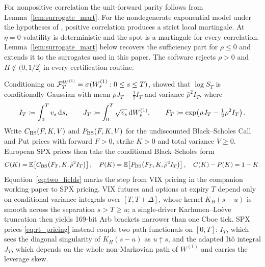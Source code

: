 For nonpositive correlation the unit-forward parity follows from Lemma~\ref{lem:surrogate_mart}. For the nondegenerate exponential model under the hypotheses of \citet[Theorem~1.1]{Gassiat2019}, positive correlation produces a strict local martingale. At $\eta=0$ volatility is deterministic and the spot is a martingale for every correlation. Lemma~\ref{lem:surrogate_mart} below recovers the sufficiency part for $\rho\le 0$ and extends it to the surrogates used in this paper. The software rejects $\rho>0$ and $H\notin(0,1/2]$ in every certification routine.

Conditioning on $\mathcal{F}_T^{W^{(1)}}=\sigma(W_s^{(1)}:0\le s\le T)$, \citet{RomanoTouzi1997} showed that $\log S_T$ is conditionally Gaussian with mean $\rho J_T - \tfrac12 I_T$ and variance $\bar{\rho}^2 I_T$, where
\begin{equation}
  \begin{gathered}
  I_T \coloneqq \int_0^T v_s\,\mathrm{d} s,
  \qquad
  J_T \coloneqq \int_0^T \sqrt{v_s}\,\mathrm{d} W_s^{(1)},
  \qquad
  F_T \coloneqq \exp\!\left(\rho J_T - \tfrac12\rho^2 I_T\right).
  \end{gathered}
  \label{eq:two_fields}
\end{equation}
Write $C_{\mathrm{BS}}(F,K,V)$ and $P_{\mathrm{BS}}(F,K,V)$ for the undiscounted Black--Scholes Call and Put prices with forward $F>0$, strike $K>0$ and total variance $V\ge 0$. European SPX prices then take the conditional Black--Scholes form
\begin{equation}
  \begin{gathered}
  C(K) = \mathbb{E}\!\left[C_{\mathrm{BS}}\!\left(F_T,K,\bar{\rho}^2 I_T\right)\right],
  \quad
  P(K) = \mathbb{E}\!\left[P_{\mathrm{BS}}\!\left(F_T,K,\bar{\rho}^2 I_T\right)\right],
  \quad
  C(K) - P(K) = 1 - K.
  \end{gathered}
  \label{eq:rt_pricing}
\end{equation}
Equation~\eqref{eq:two_fields} marks the step from VIX pricing in the companion working paper \RoughCert{} \citep{AhmedEtAl2026RoughCert} to SPX pricing. VIX futures and options at expiry $T$ depend only on conditional variance integrals over $[T,T+\Delta]$, whose kernel $K_H(s-u)$ is smooth across the separation $s>T\ge u$; a single-driver Karhunen--Lo\`eve truncation then yields 169-bit Arb brackets narrower than one Cboe tick. SPX prices \eqref{eq:rt_pricing} instead couple two path functionals on $[0,T]$: $I_T$, which sees the diagonal singularity of $K_H(s-u)$ as $u\uparrow s$, and the adapted It\^o integral $J_T$, which depends on the whole non-Markovian path of $W^{(1)}$ and carries the leverage skew.


